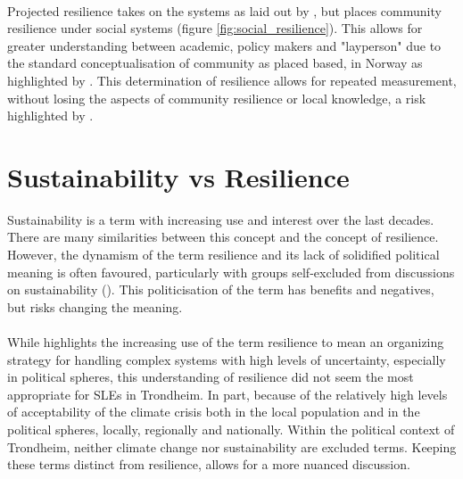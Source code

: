 \paragraph{}

Projected resilience takes on the systems as laid out by \cite{cutter_community_2020}, but places community resilience under social systems (figure \ref{fig:social_resilience}). This allows for greater understanding between academic, policy makers and "layperson" due to the standard conceptualisation of community as placed based, in Norway as highlighted by \cite{rasanen_conceptualizing_2020}. This determination of resilience allows for repeated measurement, without losing the aspects of community resilience or local knowledge, a risk highlighted by \cite{rasanen_conceptualizing_2020}.



\section{Sustainability vs Resilience}

Sustainability is a term with increasing use and interest over the last decades. There are many similarities between this concept and the concept of resilience. However, the dynamism of the term resilience and its lack of solidified political meaning is often favoured, particularly with groups self-excluded from discussions on sustainability (\cite{moser_turbulent_2019}). This politicisation of the term has benefits and negatives, but risks changing the meaning.
\paragraph{}

While \cite{moser_turbulent_2019} highlights the increasing use of the term resilience to mean an organizing strategy for handling complex systems with high levels of uncertainty, especially in political spheres, this understanding of resilience did not seem the most appropriate for SLEs in Trondheim. In part, because of the relatively high levels of acceptability of the climate crisis both in the local population and in the political spheres, locally, regionally and nationally. Within the political context of Trondheim, neither climate change nor sustainability are excluded terms. Keeping these terms distinct from resilience, allows for a more nuanced discussion.







